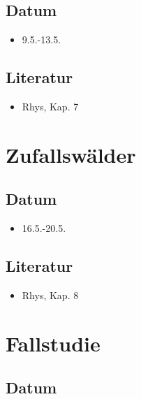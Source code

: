 \documentclass[
]{book}
\providecommand{\tightlist}{%
  \setlength{\itemsep}{0pt}\setlength{\parskip}{0pt}}
\begin{document}
\hypertarget{datum-8}{%
\subsection{Datum}\label{datum-8}}

\begin{itemize}
\tightlist
\item
  9.5.-13.5.
\end{itemize}

\hypertarget{literatur-8}{%
\subsection{Literatur}\label{literatur-8}}

\begin{itemize}
\tightlist
\item
  Rhys, Kap. 7
\end{itemize}

\hypertarget{zufallswuxe4lder}{%
\section{Zufallswälder}\label{zufallswuxe4lder}}

\hypertarget{datum-9}{%
\subsection{Datum}\label{datum-9}}

\begin{itemize}
\tightlist
\item
  16.5.-20.5.
\end{itemize}

\hypertarget{literatur-9}{%
\subsection{Literatur}\label{literatur-9}}

\begin{itemize}
\tightlist
\item
  Rhys, Kap. 8
\end{itemize}

\hypertarget{fallstudie}{%
\section{Fallstudie}\label{fallstudie}}

\hypertarget{datum-10}{%
\subsection{Datum}\label{datum-10}}
\end{document}
